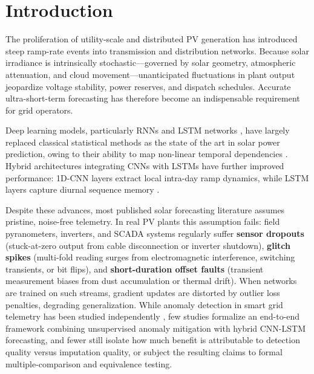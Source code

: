 \documentclass[conference]{IEEEtran}
\begin{document}
\section{Introduction}

The proliferation of utility-scale and distributed PV generation has introduced steep ramp-rate events into transmission and distribution networks. Because solar irradiance is intrinsically stochastic---governed by solar geometry, atmospheric attenuation, and cloud movement---unanticipated fluctuations in plant output jeopardize voltage stability, power reserves, and dispatch schedules. Accurate ultra-short-term forecasting has therefore become an indispensable requirement for grid operators.

Deep learning models, particularly RNNs and LSTM networks \cite{hochreiter1997lstm}, have largely replaced classical statistical methods as the state of the art in solar power prediction, owing to their ability to map non-linear temporal dependencies \cite{mellit2021deep, sobri2018review}. Hybrid architectures integrating CNNs with LSTMs have further improved performance: 1D-CNN layers extract local intra-day ramp dynamics, while LSTM layers capture diurnal sequence memory \cite{zang2020cnnlstm, obiora2021hourly, qu2021dayahead, boucetta2024enhanced}.

Despite these advances, most published solar forecasting literature assumes pristine, noise-free telemetry. In real PV plants this assumption fails: field pyranometers, inverters, and SCADA systems regularly suffer \textbf{sensor dropouts} (stuck-at-zero output from cable disconnection or inverter shutdown), \textbf{glitch spikes} (multi-fold reading surges from electromagnetic interference, switching transients, or bit flips), and \textbf{short-duration offset faults} (transient measurement biases from dust accumulation or thermal drift). When networks are trained on such streams, gradient updates are distorted by outlier loss penalties, degrading generalization. While anomaly detection in smart grid telemetry has been studied independently \cite{zhang2021survey}, few studies formalize an end-to-end framework combining unsupervised anomaly mitigation with hybrid CNN-LSTM forecasting, and fewer still isolate how much benefit is attributable to detection quality versus imputation quality, or subject the resulting claims to formal multiple-comparison and equivalence testing.
\end{document}
